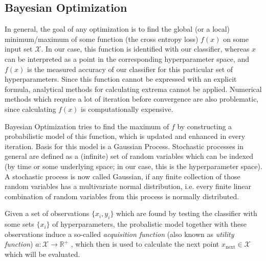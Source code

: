 \subsection{Bayesian Optimization}\label{subsec:bayes_opt}
In general, the goal of any optimization is to find the global (or a local) minimum/maximum of some function (the cross entropy loss) $f(x)$ on some input set $\mathcal{X}$. In our case, this function is identified with our classifier, whereas $x$ can be interpreted as a point in the corresponding hyperparameter space, and $f(x)$ is the measured accuracy of our classifier for this particular set of hyperparameters. Since this function cannot be expressed with an explicit formula, analytical methods for calculating extrema cannot be applied. Numerical methods which require a lot of iteration before convergence are also problematic, since calculating $f(x)$ is computationally expensive. \par
Bayesian Optimization tries to find the maximum of $f$ by constructing a probabilistic model of this function, which is updated and enhanced in every iteration. Basis for this model is a Gaussian Process. Stochastic processes in general are defined as a (infinite) set of random variables which can be indexed (by time or some underlying space; in our case, this is the hyperparameter space). A stochastic process is now called Gaussian, if any finite collection of those random variables has a multivariate normal distribution, i.e. every finite linear combination of random variables from this process is normally distributed. \par
Given a set of observations $\{x_i,y_i\}$ which are found by testing the classifier with some sets $\{x_i\}$ of hyperparameters, the probalistic model together with these observations induce a so-called \emph{acquisition function} (also known as \emph{utility function}) $a: \mathcal{X} \rightarrow \mathbb{R}^+$ , which then is used to calculate the next point $x_{\text{next}} \in \mathcal{X}$ which will be evaluated. \cite{snoek2012practical}

